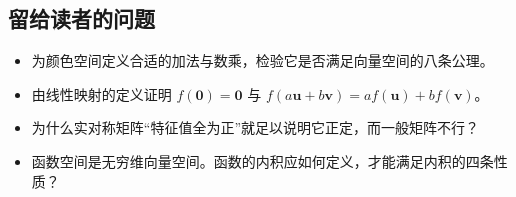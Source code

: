 \documentclass[a4paper]{article}
\begin{document}
\subsection{留给读者的问题}

\begin{itemize}
\item 为颜色空间定义合适的加法与数乘，检验它是否满足向量空间的八条公理。
\item 由线性映射的定义证明 $f(\boldsymbol 0)=\boldsymbol 0$ 与 $f(a\boldsymbol u+b\boldsymbol v)=af(\boldsymbol u)+bf(\boldsymbol v)$。
\item 为什么实对称矩阵“特征值全为正”就足以说明它正定，而一般矩阵不行？
\item 函数空间是无穷维向量空间。函数的内积应如何定义，才能满足内积的四条性质？
\end{itemize}
\end{document}
